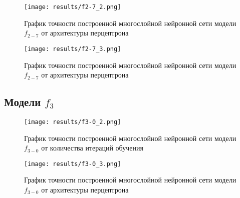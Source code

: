    
  
  
  \begin{figure}[H]
  	\texttt{[image: results/f2-7\_2.png]}
  	
  	\caption{График точности построенной многослойной нейронной сети модели $f_{2-7}$ от архитектуры перцептрона}
  	
  \end{figure}
  
  
  \begin{figure}[H]
  	\texttt{[image: results/f2-7\_3.png]}
  	
  	\caption{График точности построенной многослойной нейронной сети модели $f_{2-7}$ от архитектуры перцептрона}	
  \end{figure}
  
  
\subsection{Модели $f_{3}$}

\bigskip
\begin{figure}[H]
	\texttt{[image: results/f3-0\_2.png]}
	
	\caption{График точности построенной многослойной нейронной сети модели $f_{3-0}$ от количества итераций обучения}
	
\end{figure}


\begin{figure}[H]
	\texttt{[image: results/f3-0\_3.png]}
	
	\caption{График точности построенной многослойной нейронной сети модели $f_{3-0}$ от архитектуры перцептрона}	
\end{figure}


